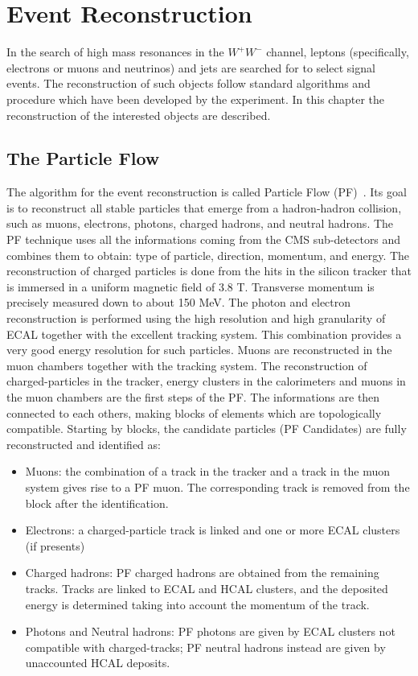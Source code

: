 \chapter{Event Reconstruction}
In the search of high mass resonances in the $W^+W^-$ channel, leptons (specifically, electrons or muons and neutrinos) and jets are searched for to select signal events.
The reconstruction of such objects follow standard algorithms and procedure which have been
developed by the experiment. In this chapter the reconstruction of the interested objects are described.

\section{The Particle Flow}
\label{PFt}
The algorithm for the event reconstruction is called Particle Flow (PF)~\cite{CMS-PAS-PFT-09-001}. Its goal is to reconstruct all stable particles that emerge from a hadron-hadron collision, such as muons, electrons, photons, charged hadrons, and neutral hadrons. The PF technique uses all the informations coming from the 
CMS sub-detectors and combines them to obtain: type of particle, direction, momentum, and energy.
The reconstruction of charged particles is done from the hits in the silicon tracker that is immersed in a uniform magnetic field of 3.8 T. 
Transverse momentum is precisely measured down to about 150 MeV.
The photon and electron reconstruction is performed using the high resolution and high granularity of ECAL together with the excellent tracking system. This combination provides a very good energy resolution for such particles. Muons are reconstructed in the muon chambers together with the tracking system.
The reconstruction of charged-particles in the tracker, energy clusters in the calorimeters and muons in the muon chambers are the first steps of the PF. The informations are then connected to each others, making blocks of elements which are topologically compatible.
Starting by blocks, the candidate particles (PF Candidates) are fully reconstructed and identified as:
\begin{itemize}
\item Muons: the combination of a track in the tracker and a track in the muon system gives rise to a PF muon. The corresponding track is removed from the block after the identification.
\item Electrons: a charged-particle track is linked and one or more ECAL clusters (if presents)
\item Charged hadrons: PF charged hadrons are obtained from the remaining tracks. Tracks 
are linked to ECAL and HCAL clusters, and the deposited energy is determined taking into
account the momentum of the track.
\item Photons and Neutral hadrons: PF photons are given by ECAL clusters not compatible with charged-tracks; PF
neutral hadrons instead are given by unaccounted HCAL deposits.
\end{itemize}
